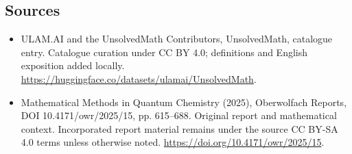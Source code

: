 \documentclass[11pt]{article}
\begin{document}
\subsection{Sources}
\begin{itemize}
\item[\hypertarget{source:statement:1}{S1}] ULAM.AI and the UnsolvedMath Contributors, UnsolvedMath, catalogue entry. Catalogue curation under CC BY 4.0; definitions and English exposition added locally.
\url{https://huggingface.co/datasets/ulamai/UnsolvedMath}.
\item[\hypertarget{source:statement:2}{S2}] Mathematical Methods in Quantum Chemistry (2025), Oberwolfach Reports, DOI 10.4171/owr/2025/15, pp. 615--688. Original report and mathematical context. Incorporated report material remains under the source CC BY-SA 4.0 terms unless otherwise noted.
\url{https://doi.org/10.4171/owr/2025/15}.
\end{itemize}
\label{end:statement}
\end{document}
